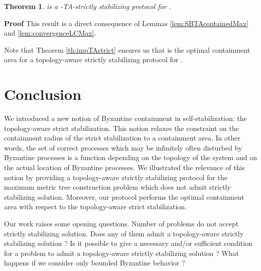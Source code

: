 \documentclass[11pt]{article}
\newenvironment{proof}{\noindent\textbf{Proof}}{\hfill\qed}
\newcommand{\qed}{\hfill}
\newtheorem{theo}{Theorem}
\newenvironment{theorem}[1]{\vspace{-0.25cm}\begin{theo}#1}{\end{theo}\vspace{-0.3cm}}
\begin{document}
\begin{theorem}\label{th:SSMAXstrict}
 is a -TA-strictly stabilizing protocol for .
\end{theorem}

\begin{proof}
This result is a direct consequence of Lemmas \ref{lem:SBTAcontainedMax} and \ref{lem:convergenceLCMax}.
\end{proof}

Note that Theorem \ref{th:impTAstrict} ensures us that  is the optimal containment area for a topology-aware strictly stabilizing protocol for .

\section{Conclusion}

We introduced a new notion of Byzantine containment in self-stabilization: the topology-aware strict stabilization. This notion relaxes the constraint on the containment radius of the strict stabilization to a containment area. In other words, the set of correct processes which may be infinitely often disturbed by Byzantine processes is a function depending on the topology of the system and on the actual location of Byzantine processes. We illustrated the relevance of this notion by providing a topology-aware strictly stabilizing protocol for the maximum metric tree construction problem which does not admit strictly stabilizing solution. Moreover, our protocol performs the optimal containment area with respect to the topology-aware strict stabilization.

Our work raises some opening questions. Number of problems do not accept strictly stabilizing solution. Does any of them admit a topology-aware strictly stabilizing solution ? Is it possible to give a necessary and/or sufficient condition for a problem to admit a topology-aware strictly stabilizing solution ? What happens if we consider only bounded Byzantine behavior ?



\end{document}
